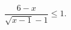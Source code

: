 \begin{ex}[type=inequality]
	\begin{condition}
		$\dfrac{6 - x}{\sqrt{x - 1} - 1}\leqslant1.$
	\end{condition}
	\answer{$ x \in[1;2)\cup[5;+\infty).$}
\end{ex}